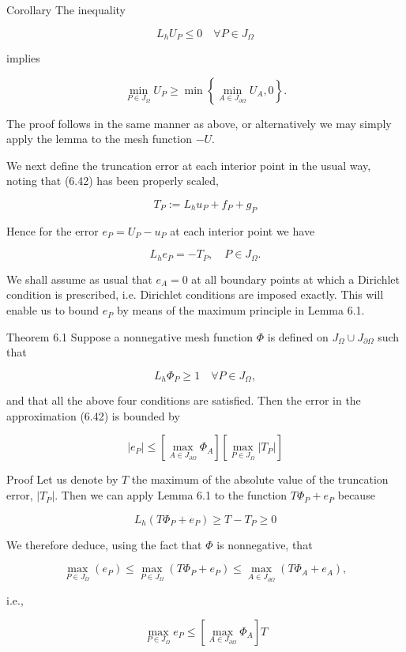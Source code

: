 \documentclass[10pt]{article}
\begin{document}
Corollary The inequality

\[
L_{h} U_{P} \leq 0 \quad \forall P \in J_{\Omega}
\]

implies

\[
\min _{P \in J_{\Omega}} U_{P} \geq \min \left\{\min _{A \in J_{\partial \Omega}} U_{A}, 0\right\} .
\]

The proof follows in the same manner as above, or alternatively we may simply apply the lemma to the mesh function \(-U\).

We next define the truncation error at each interior point in the usual way, noting that (6.42) has been properly scaled,

\[
T_{P}:=L_{h} u_{P}+f_{P}+g_{P}
\]

Hence for the error \(e_{P}=U_{P}-u_{P}\) at each interior point we have

\[
L_{h} e_{P}=-T_{P}, \quad P \in J_{\Omega} .
\]

We shall assume as usual that \(e_{A}=0\) at all boundary points at which a Dirichlet condition is prescribed, i.e. Dirichlet conditions are imposed exactly. This will enable us to bound \(e_{P}\) by means of the maximum principle in Lemma 6.1.

Theorem 6.1 Suppose a nonnegative mesh function \(\Phi\) is defined on \(J_{\Omega} \cup J_{\partial \Omega}\) such that

\[
L_{h} \Phi_{P} \geq 1 \quad \forall P \in J_{\Omega},
\]

and that all the above four conditions are satisfied. Then the error in the approximation (6.42) is bounded by

\[
\left|e_{P}\right| \leq\left[\max _{A \in J_{\partial \Omega}} \Phi_{A}\right]\left[\max _{P \in J_{\Omega}}\left|T_{P}\right|\right]
\]

Proof Let us denote by \(T\) the maximum of the absolute value of the truncation error, \(\left|T_{P}\right|\). Then we can apply Lemma 6.1 to the function \(T \Phi_{P}+e_{P}\) because

\[
L_{h}\left(T \Phi_{P}+e_{P}\right) \geq T-T_{P} \geq 0
\]

We therefore deduce, using the fact that \(\Phi\) is nonnegative, that

\[
\max _{P \in J_{\Omega}}\left(e_{P}\right) \leq \max _{P \in J_{\Omega}}\left(T \Phi_{P}+e_{P}\right) \leq \max _{A \in J_{\partial \Omega}}\left(T \Phi_{A}+e_{A}\right),
\]

i.e.,

\[
\max _{P \in J_{\Omega}} e_{P} \leq\left[\max _{A \in J_{\partial \Omega}} \Phi_{A}\right] T
\]
\end{document}
